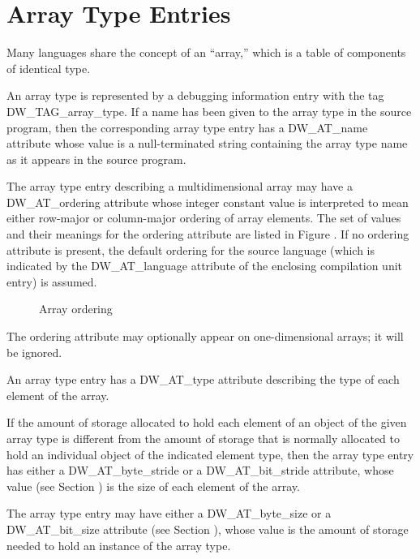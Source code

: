 \section{Array Type Entries}
\label{chap:arraytypeentries}

Many languages share the concept of an ``array,'' which is
a table of components of identical type.

An array type is represented by a debugging information entry
with the tag DW\_TAG\_array\_type. If a name has been given to
the array type in the source program, then the corresponding
array type entry has a DW\_AT\_name attribute whose value is a
null-terminated string containing the array type name as it
appears in the source program.

The array type entry describing a multidimensional array may
have a DW\_AT\_ordering attribute whose integer constant value is
interpreted to mean either row-major or column-major ordering
of array elements. The set of values and their meanings
for the ordering attribute are listed in 
Figure . 
If no
ordering attribute is present, the default ordering for the
source language (which is indicated by the DW\_AT\_language
attribute of the enclosing compilation unit entry) is assumed.

\begin{figure}[here]
\caption{Array ordering}\label{fig:arrayordering}
\end{figure}

The ordering attribute may optionally appear on one-dimensional
arrays; it will be ignored.

An array type entry has a DW\_AT\_type attribute describing
the type of each element of the array.

If the amount of storage allocated to hold each element of an
object of the given array type is different from the amount
of storage that is normally allocated to hold an individual
object of the indicated element type, then the array type
entry has either a DW\_AT\_byte\_stride or a DW\_AT\_bit\_stride
attribute, whose value 
(see Section ) 
is the size of each
element of the array.

The array type entry may have either a DW\_AT\_byte\_size or a
DW\_AT\_bit\_size attribute 
(see Section ), 
whose value is the
amount of storage needed to hold an instance of the array type.

